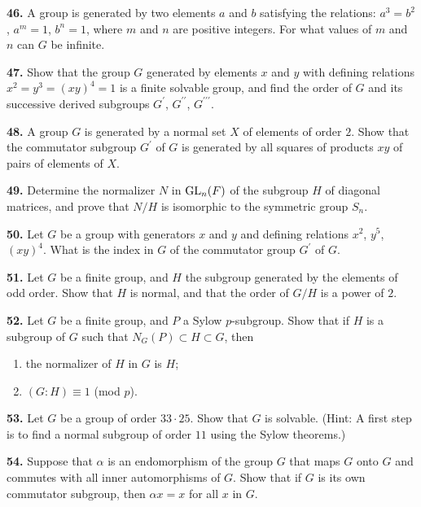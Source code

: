 \documentclass[a4paper,11pt,final]{memoir}%
\theoremstyle{nonumberplain}
\begin{document}
\medskip\noindent\textbf{46.} A group is generated by two elements $a$ and $b
$ satisfying the relations: $a^{3}=b^{2}$, $a^{m}=1$, $b^{n}=1$, where $m$ and
$n$ are positive integers. For what values of $m$ and $n$ can $G$ be infinite.

\medskip\noindent\textbf{47.} Show that the group $G$ generated by elements
$x$ and $y$ with defining relations $x^{2}=y^{3}=(xy)^{4}=1$ is a finite
solvable group, and find the order of $G$ and its successive derived subgroups
$G^{\prime}$, $G^{\prime\prime}$, $G^{\prime\prime\prime}$.

\medskip\noindent\textbf{48.} A group $G$ is generated by a normal set $X$ of
elements of order $2$. Show that the commutator subgroup $G^{\prime}$ of $G$
is generated by all squares of products $xy$ of pairs of elements of $X$.

\medskip\noindent\textbf{49.} Determine the normalizer $N$ in $\operatorname{GL}_{n}(F)$ of
the subgroup $H$ of diagonal matrices, and prove that $N/H$ is isomorphic to
the symmetric group $S_{n}$.

\medskip\noindent\textbf{50.} Let $G$ be a group with generators $x$ and $y$
and defining relations $x^{2}$, $y^{5}$, $(xy)^{4}$. What is the index in $G$
of the commutator group $G^{\prime}$ of $G$.

\medskip\noindent\textbf{51.} Let $G$ be a finite group, and $H$ the subgroup
generated by the elements of odd order. Show that $H$ is normal, and that the
order of $G/H$ is a power of $2$.

\medskip\noindent\textbf{52.} Let $G$ be a finite group, and $P$ a Sylow
$p$-subgroup. Show that if $H$ is a subgroup of $G$ such that $N_{G}(P)\subset
H\subset G$, then

\begin{enumerate}
\item the normalizer of $H$ in $G$ is $H$;

\item $(G:H)\equiv1$ (mod $p$).
\end{enumerate}

\medskip\noindent\textbf{53.} Let $G$ be a group of order $33\cdot25$. Show
that $G$ is solvable. (Hint: A first step is to find a normal subgroup of
order $11$ using the Sylow theorems.)

\medskip\noindent\textbf{54.} Suppose that $\alpha$ is an endomorphism of the
group $G$ that maps $G$ onto $G$ and commutes with all inner automorphisms of
$G$. Show that if $G$ is its own commutator subgroup, then $\alpha x=x$ for
all $x$ in $G$.
\end{document}
